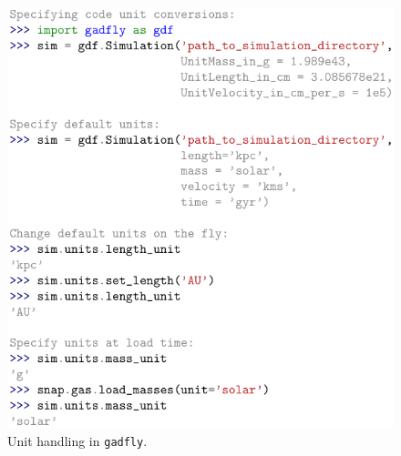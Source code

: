 \documentclass{emulateapj}
\newcommand{\code}[1]{\texttt{#1}}
\begin{document}
\begin{figure}[h!]
\begin{center}
\includegraphics[width=0.98\columnwidth]{figures/code_units/code_units}
\caption{\label{fig:units}
Unit handling in \code{gadfly}.%
}
\end{center}
\end{figure}
\end{document}
